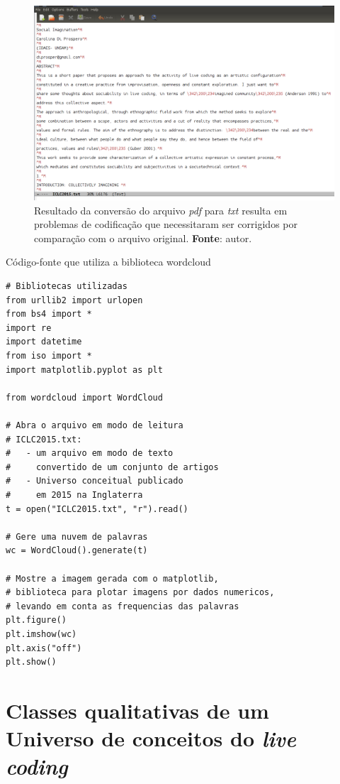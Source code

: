 \begin{figure}[!h]
  \centering
  \includegraphics[scale=0.3]{imagens/utf8.png}
  \caption{Resultado da conversão do arquivo \emph{pdf} para \emph{txt} resulta em problemas de codificação que necessitaram ser corrigidos por comparação com o arquivo original. \textbf{Fonte}: autor.}
  \label{fig:utf8}
\end{figure}


\begin{example}{Código-fonte que utiliza a biblioteca wordcloud}  
\begin{verbatim}
# Bibliotecas utilizadas
from urllib2 import urlopen
from bs4 import *
import re
import datetime
from iso import *
import matplotlib.pyplot as plt

from wordcloud import WordCloud
    
# Abra o arquivo em modo de leitura
# ICLC2015.txt: 
#   - um arquivo em modo de texto 
#     convertido de um conjunto de artigos
#   - Universo conceitual publicado
#     em 2015 na Inglaterra  
t = open("ICLC2015.txt", "r").read()

# Gere uma nuvem de palavras
wc = WordCloud().generate(t)
    
# Mostre a imagem gerada com o matplotlib,
# biblioteca para plotar imagens por dados numericos,
# levando em conta as frequencias das palavras
plt.figure()
plt.imshow(wc)
plt.axis("off")
plt.show()
\end{verbatim}
\label{cod:nuvem}
\end{example}

\section{Classes qualitativas de um Universo de conceitos do \emph{live coding}}

